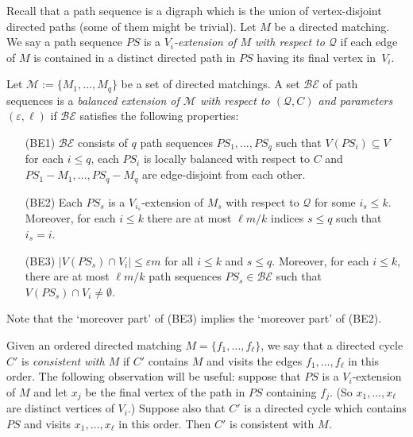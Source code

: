 \documentclass{memo-l}
\def\COMMENT#1{}
\def\eps{\varepsilon}
\numberwithin{section}{chapter}
\numberwithin{equation}{section}
\numberwithin{firstthm}{section}
\numberwithin{figure}{section}
\begin{document}
{Recall that a path sequence is a digraph which is the union of vertex-disjoint directed paths (some of them might be trivial).
Let $M$ be a directed matching.
We say a path sequence $PS$ is a \emph{$V_i$-extension of $M$ with respect to $\mathcal{Q}$} if each edge of $M$ is
contained in a distinct directed path in $PS$ having its final vertex in~$V_i$.%
	\COMMENT{We write $V_i$-extension instead of $i$-extension, because in the bipartite case, we take $\mathcal{Q} = \{A_1, \dots, A_K, B_1, \dots, B_K\}$.}
Let $\mathcal{M} := \{ M_{1}, \dots, M_{q}\}$ be a set of directed matchings. 
A set $\mathcal{BE}$ of path sequences is a \emph{balanced extension of $\mathcal{M}$ with respect to $(\mathcal{Q},C)$
and parameters $(\eps, \ell)$} if $\mathcal{BE}$ satisfies the following properties:
\begin{itemize}
	\item[(BE1)] $\mathcal{BE}$ consists of $q$ path sequences $PS_1, \dots, PS_q$ such that $V(PS_i)\subseteq V$ for
each $i\le q$, each $PS_i$ is locally balanced with respect to $C$ and $PS_1-M_1,\dots,PS_q-M_q$ are edge-disjoint from each other.%
   \COMMENT{Daniela: now have that $PS_1-M_1,\dots,PS_q-M_q$ are edge-disjoint instead of the $PS_s$ themselves}
	\item[(BE2)] Each $PS_s$ is a $V_{i_s}$-extension of $M_s$ with respect to $\mathcal{Q}$ for some $i_s \le k$.
Moreover, for each $i \le k$ there are at most $\ell m/k$  indices $s\le q$ such that $i_s=i$.%
    \COMMENT{will have $k=2K$ in the bip case}
	\item[(BE3)] $|V(PS_s) \cap V_i |\le \eps m$ for all $i \le k $ and $s \le q$. Moreover, for each $i \le k$, there are at most $\ell m/k$ path sequences $PS_s \in \mathcal{BE}$ such that $V(PS_s) \cap V_i \ne \emptyset$.
\end{itemize}

Note that the `moreover part' of (BE3) implies the `moreover part' of (BE2).%
     \COMMENT{Deryk: new sentence}

Given an ordered directed matching $M = \{f_1, \dots, f_{\ell}\}$, we say that a directed cycle $C'$ is
\emph{consistent with $M$} if $C'$ contains $M$ and visits the edges $f_1, \dots ,f_{\ell}$ in this order.
The following observation will be useful:
suppose that $PS$ is a $V_i$-extension of $M$ and let $x_j$ be the final vertex of the path in $PS$ containing $f_j$.
(So $x_1, \dots, x_{\ell}$ are distinct vertices of $V_i$.)
Suppose also that $C'$ is a directed cycle which contains $PS$  and visits $x_1, \dots, x_{\ell}$ in this order.
Then $C'$ is consistent with $M$.













}
\end{document}
